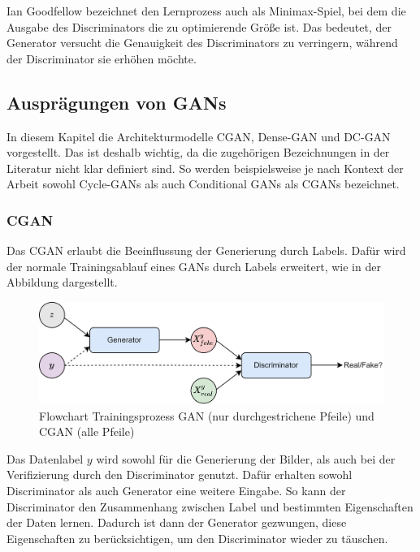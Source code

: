 Ian Goodfellow bezeichnet den Lernprozess auch als Minimax-Spiel, bei dem die Ausgabe des Discriminators die zu optimierende Größe ist.
Das bedeutet, der Generator versucht die Genauigkeit des Discriminators zu verringern, während der Discriminator sie erhöhen möchte. \cite{gan-minimax}

\subsection{Ausprägungen von GANs}
In diesem Kapitel die Architekturmodelle CGAN, Dense-GAN und DC-GAN vorgestellt.
Das ist deshalb wichtig, da die zugehörigen Bezeichnungen in der Literatur nicht klar definiert sind.
So werden beispielsweise je nach Kontext der Arbeit sowohl Cycle-GANs als auch Conditional GANs als CGANs bezeichnet.

\subsubsection{CGAN}
Das \acrfull{CGAN} \cite{mirza2014conditional, gan-conditional} erlaubt die Beeinflussung der Generierung durch Labels.
Dafür wird der normale Trainingsablauf eines GANs durch Labels erweitert, wie in der Abbildung dargestellt.
\begin{figure}[H]
	\centering
	\includegraphics[width=14cm]{kapitel/2_stand_der_technik/img/cgan-vs-gan.drawio.png}
	\caption[Flowchart Trainingsprozess GAN und CGAN]{Flowchart Trainingsprozess GAN (nur durchgestrichene Pfeile) und CGAN (alle Pfeile)}
	\label{flowchart-cgan-vs-gan}
\end{figure}

Das Datenlabel $y$ wird sowohl für die Generierung der Bilder, als auch bei der Verifizierung durch den Discriminator genutzt.
Dafür erhalten sowohl Discriminator als auch Generator eine weitere Eingabe.
So kann der Discriminator den Zusammenhang zwischen Label und bestimmten Eigenschaften der Daten lernen.
Dadurch ist dann der Generator gezwungen, diese Eigenschaften zu berücksichtigen, um den Discriminator wieder zu täuschen.
\newline


